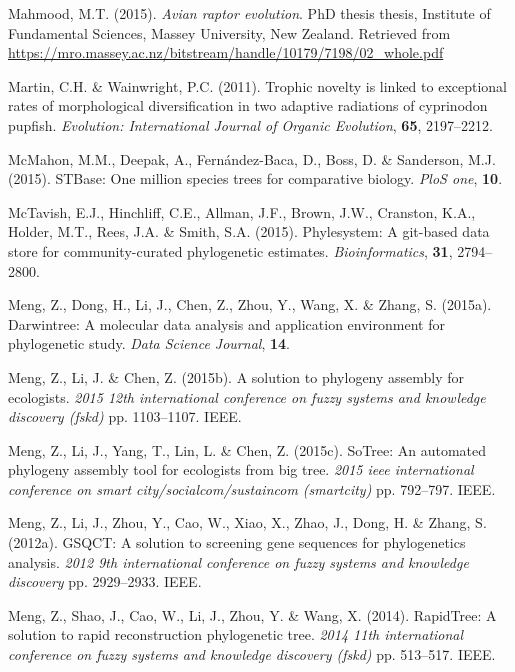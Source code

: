 \documentclass[]{article}
\begin{document}
\leavevmode\hypertarget{ref-mahmood2015avian}{}%
Mahmood, M.T. (2015). \emph{Avian raptor evolution}. PhD thesis thesis, Institute of Fundamental Sciences, Massey University, New Zealand. Retrieved from \url{https://mro.massey.ac.nz/bitstream/handle/10179/7198/02_whole.pdf}

\leavevmode\hypertarget{ref-martin2011trophic}{}%
Martin, C.H. \& Wainwright, P.C. (2011). Trophic novelty is linked to exceptional rates of morphological diversification in two adaptive radiations of cyprinodon pupfish. \emph{Evolution: International Journal of Organic Evolution}, \textbf{65}, 2197--2212.

\leavevmode\hypertarget{ref-mcmahon2015stbase}{}%
McMahon, M.M., Deepak, A., Fernández-Baca, D., Boss, D. \& Sanderson, M.J. (2015). STBase: One million species trees for comparative biology. \emph{PloS one}, \textbf{10}.

\leavevmode\hypertarget{ref-mctavish2015phylesystem}{}%
McTavish, E.J., Hinchliff, C.E., Allman, J.F., Brown, J.W., Cranston, K.A., Holder, M.T., Rees, J.A. \& Smith, S.A. (2015). Phylesystem: A git-based data store for community-curated phylogenetic estimates. \emph{Bioinformatics}, \textbf{31}, 2794--2800.

\leavevmode\hypertarget{ref-meng2015darwintree}{}%
Meng, Z., Dong, H., Li, J., Chen, Z., Zhou, Y., Wang, X. \& Zhang, S. (2015a). Darwintree: A molecular data analysis and application environment for phylogenetic study. \emph{Data Science Journal}, \textbf{14}.

\leavevmode\hypertarget{ref-meng2015solution}{}%
Meng, Z., Li, J. \& Chen, Z. (2015b). A solution to phylogeny assembly for ecologists. \emph{2015 12th international conference on fuzzy systems and knowledge discovery (fskd)} pp. 1103--1107. IEEE.

\leavevmode\hypertarget{ref-meng2015sotree}{}%
Meng, Z., Li, J., Yang, T., Lin, L. \& Chen, Z. (2015c). SoTree: An automated phylogeny assembly tool for ecologists from big tree. \emph{2015 ieee international conference on smart city/socialcom/sustaincom (smartcity)} pp. 792--797. IEEE.

\leavevmode\hypertarget{ref-meng2012gsqct}{}%
Meng, Z., Li, J., Zhou, Y., Cao, W., Xiao, X., Zhao, J., Dong, H. \& Zhang, S. (2012a). GSQCT: A solution to screening gene sequences for phylogenetics analysis. \emph{2012 9th international conference on fuzzy systems and knowledge discovery} pp. 2929--2933. IEEE.

\leavevmode\hypertarget{ref-meng2014rapidtree}{}%
Meng, Z., Shao, J., Cao, W., Li, J., Zhou, Y. \& Wang, X. (2014). RapidTree: A solution to rapid reconstruction phylogenetic tree. \emph{2014 11th international conference on fuzzy systems and knowledge discovery (fskd)} pp. 513--517. IEEE.
\end{document}
